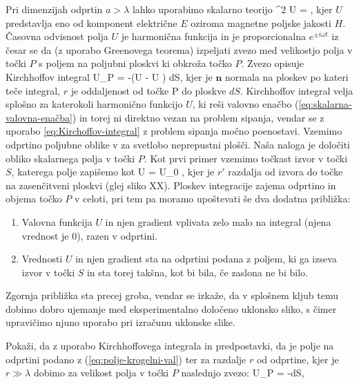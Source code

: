Pri dimenzijah odprtin $a>\lambda$ lahko uporabimo skalarno teorijo
\beq
\nabla^2 U = ,
\label{eq:skalarna-valovna-enačba}
\eeq
kjer $U$ predstavlja eno od komponent električne $E$ oziroma magnetne poljske jakosti $H$.
Časovna odvisnost polja $U$ je harmonična funkcija in je proporcionalna $e^{\pm i \omega t}$ iz
česar se da (z uporabo Greenovega teorema) izpeljati zvezo med velikostjo polja v točki
$P$ s poljem na poljubni ploskvi ki obkroža točko $P$. Zvezo opisuje Kirchhoffov integral 
\beq
U_P = -\int\int\left(U \cdot \nabla {}-
\cdot \nabla U \right) dS,
\label{eq:Kirchoffov-integral}
\eeq
kjer je $\mathbf{n}$ normala na ploskev po kateri teče integral, $r$ je oddaljenost od točke P
do ploskve $dS$. Kirchhoffov integral velja splošno za katerokoli harmonično 
funkcijo $U$, ki reši valovno enačbo (\ref{eq:skalarna-valovna-enačba}) in torej
ni direktno vezan na problem sipanja, vendar se z uporabo \ref{eq:Kirchoffov-integral} z
problem sipanja močno poenostavi. Vzemimo odprtino poljubne oblike v za svetlobo
neprepustni plošči. Naša naloga je določiti obliko skalarnega polja v točki $P$.
Kot prvi primer vzemimo točkast izvor v točki $S$, katerega polje zapišemo kot
\beq
\label{eq:polje-krogelni-val}
U = U_0 ,
\eeq
kjer je $r'$ razdalja od izvora do točke na zasenčitveni ploskvi (glej sliko XX).
Ploskev integracije zajema odprtino in objema točko $P$ v celoti, pri tem
pa moramo upoštevati še dva dodatna približka:
\begin{enumerate}
\item Valovna funkcija $U$ in njen gradient vplivata zelo malo na integral (njena vrednost je 0), 
razen v odprtini.
\item Vrednosti $U$ in njen gradient sta na odprtini podana z poljem, ki ga izseva 
izvor v točki $S$ in sta torej takšna, kot bi bila, če zaslona ne bi bilo.
\end{enumerate}
Zgornja približka sta precej groba, vendar se izkaže, da v splošnem kljub temu
dobimo dobro ujemanje med eksperimentalno določeno uklonsko sliko, s čimer 
upravičimo njuno uporabo pri izračunu uklonske slike.

\begin{definition}
\label{naloga-Fresnel-Kirchhoff-uklon}
Pokaži, da z uporabo Kirchhoffovega integrala in predpostavki, da je polje na odprtini
podano z (\ref{eq:polje-krogelni-val}) ter za razdalje $r$ od odprtine, kjer je $r \gg \lambda$
dobimo za velikost polja v točki $P$ naslednjo zvezo:
\beq
U_P = -\int\int{} dS,
\label{eq:Fresnel-Kirchoffov-integral}
\eeq
\end{definition}


